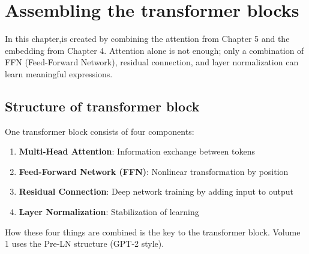 \chapter{Assembling the transformer blocks}
\label{ch:transformer_block}

In this chapter,is created by combining the attention from Chapter 5 and the embedding from Chapter 4. Attention alone is not enough; only a combination of FFN (Feed-Forward Network), residual connection, and layer normalization can learn meaningful expressions.

\section{Structure of transformer block}

One transformer block consists of four components:

\begin{enumerate}
\item\textbf{Multi-Head Attention}: Information exchange between tokens
\item\textbf{Feed-Forward Network (FFN)}: Nonlinear transformation by position
\item\textbf{Residual Connection}: Deep network training by adding input to output
\item\textbf{Layer Normalization}: Stabilization of learning
\end{enumerate}

How these four things are combined is the key to the transformer block. Volume 1 uses the Pre-LN structure (GPT-2 style).

